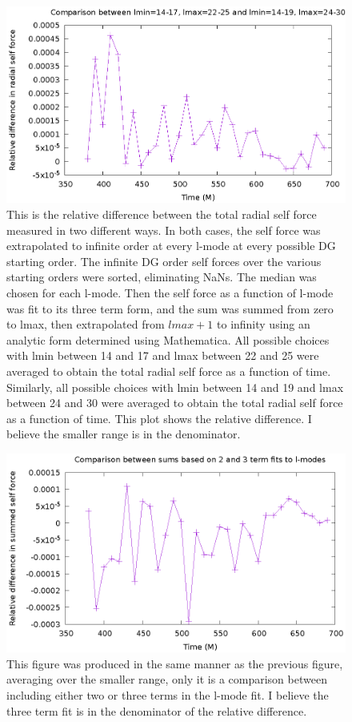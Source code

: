 \begin{figure}
  \includegraphics{relErrBigSmallRangeOverTime.eps}
  \caption{This is the relative difference between the total radial self force measured in two different ways. In both cases, the self force was extrapolated to infinite order at every l-mode at every possible DG starting order. The infinite DG order self forces over the various starting orders were sorted, eliminating NaNs. The median was chosen for each l-mode. Then the self force as a function of l-mode was fit to its three term form, and the sum was summed from zero to lmax, then extrapolated from $lmax +1 $ to infinity using an analytic form determined using Mathematica. All possible choices with lmin between 14 and 17 and lmax between 22 and 25 were averaged to obtain the total radial self force as a function of time. Similarly, all possible choices with lmin between 14 and 19 and lmax between 24 and 30 were averaged to obtain the total radial self force as a function of time. This plot shows the relative difference. I believe the smaller range is in the denominator.}
\end{figure}


\newpage

\begin{figure}
  \includegraphics{relativeError23termSelfForce.eps}
  \caption{This figure was produced in the same manner as the previous figure, averaging over the smaller range, only it is a comparison between including either two or three terms in the l-mode fit. I believe the three term fit is in the denominator of the relative difference.}
\end{figure}

